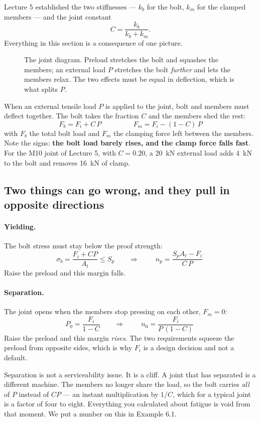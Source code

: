 \documentclass[11pt,a4paper]{article}
\begin{document}
Lecture 5 established the two stiffnesses --- $k_b$ for the bolt, $k_m$ for the clamped members ---
and the joint constant
\[
C=\frac{k_b}{k_b+k_m}.
\]
Everything in this section is a consequence of one picture.

\begin{figure}[H]\centering
\resizebox{0.86\textwidth}{!}{}
\caption{The joint diagram. Preload stretches the bolt and squashes the members; an external load
$P$ stretches the bolt \emph{further} and lets the members relax. The two effects must be equal in
deflection, which is what splits $P$.}
\label{fig:jointdiag}
\end{figure}

When an external tensile load $P$ is applied to the joint, bolt and members must deflect together.
The bolt takes the fraction $C$ and the members shed the rest:
\[
\boxed{\;F_b = F_i + C\,P\;}
\qquad\qquad
\boxed{\;F_m = F_i - (1-C)\,P\;}
\]
with $F_b$ the total bolt load and $F_m$ the clamping force left between the members. Note the
signs: \textbf{the bolt load barely rises, and the clamp force falls fast}. For the M10 joint of
Lecture 5, with $C=0.20$, a \SI{20}{kN} external load adds \SI{4}{kN} to the bolt and removes
\SI{16}{kN} of clamp.

\subsection{Two things can go wrong, and they pull in opposite directions}

\paragraph{Yielding.} The bolt stress must stay below the proof strength:
\[
\sigma_b=\frac{F_i+CP}{A_t}\le S_p
\qquad\Longrightarrow\qquad
\boxed{\;n_p=\frac{S_pA_t-F_i}{C\,P}\;}
\]
Raise the preload and this margin falls.

\paragraph{Separation.} The joint opens when the members stop pressing on each other, $F_m=0$:
\[
P_0=\frac{F_i}{1-C}
\qquad\Longrightarrow\qquad
\boxed{\;n_0=\frac{F_i}{P\,(1-C)}\;}
\]
Raise the preload and this margin \emph{rises}. The two requirements squeeze the preload from
opposite sides, which is why $F_i$ is a design decision and not a default.

\begin{aerobox}{Separation is not a serviceability issue. It is a cliff.}
A joint that has separated is a different machine. The members no longer share the load, so the
bolt carries \emph{all} of $P$ instead of $CP$ --- an instant multiplication by $1/C$, which for a
typical joint is a factor of four to eight. Everything you calculated about fatigue is void from
that moment. We put a number on this in Example 6.1.
\end{aerobox}
\end{document}
